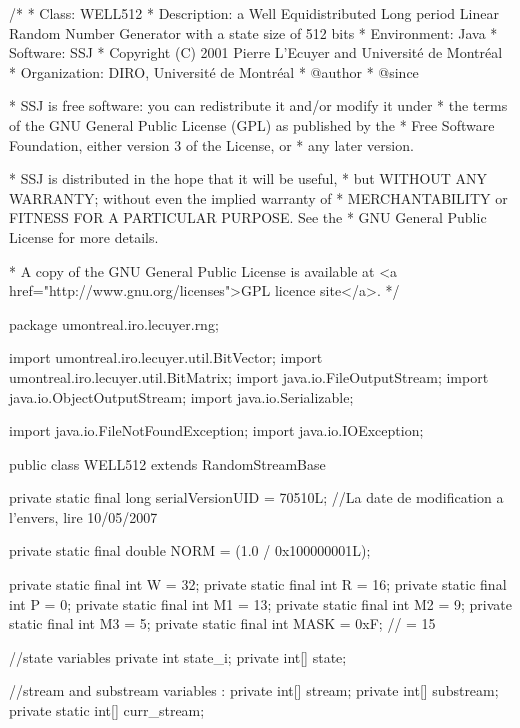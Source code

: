 \begin{code}
\begin{hide}
/*
 * Class:        WELL512
 * Description:  a Well Equidistributed Long period Linear Random Number
                 Generator with a state size of 512 bits
 * Environment:  Java
 * Software:     SSJ 
 * Copyright (C) 2001  Pierre L'Ecuyer and Université de Montréal
 * Organization: DIRO, Université de Montréal
 * @author       
 * @since

 * SSJ is free software: you can redistribute it and/or modify it under
 * the terms of the GNU General Public License (GPL) as published by the
 * Free Software Foundation, either version 3 of the License, or
 * any later version.

 * SSJ is distributed in the hope that it will be useful,
 * but WITHOUT ANY WARRANTY; without even the implied warranty of
 * MERCHANTABILITY or FITNESS FOR A PARTICULAR PURPOSE.  See the
 * GNU General Public License for more details.

 * A copy of the GNU General Public License is available at
   <a href="http://www.gnu.org/licenses">GPL licence site</a>.
 */
\end{hide}
package umontreal.iro.lecuyer.rng; \begin{hide}

import umontreal.iro.lecuyer.util.BitVector;
import umontreal.iro.lecuyer.util.BitMatrix;
import java.io.FileOutputStream;
import java.io.ObjectOutputStream;
import java.io.Serializable;

import java.io.FileNotFoundException;
import java.io.IOException;
\end{hide}

public class WELL512 extends RandomStreamBase \begin{hide} {

   private static final long serialVersionUID = 70510L;
   //La date de modification a l'envers, lire 10/05/2007

   private static final double NORM = (1.0 / 0x100000001L);

   private static final int W = 32;
   private static final int R = 16;
   private static final int P = 0;
   private static final int M1 = 13;
   private static final int M2 = 9;
   private static final int M3 = 5;
   private static final int MASK = 0xF;    // = 15

   //state variables
   private int state_i;
   private int[] state;

   //stream and substream variables :
   private int[] stream;
   private int[] substream;
   private static int[] curr_stream;

}
\end{hide}
\end{code}
